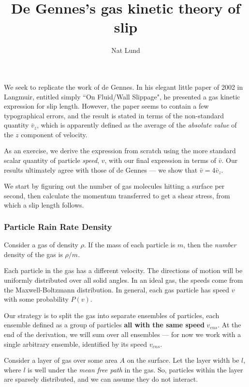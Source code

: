 \documentclass{paper}
\title{De Gennes's gas kinetic theory of slip}
\author{Nat Lund}
\begin{document}
\maketitle
We seek to replicate the work of de Gennes. In his elegant little paper of 2002 in Langmuir, entitled simply ``On Fluid/Wall Slippage", he presented a gas kinetic expression for slip length.  However, the paper seems to contain a few typographical errors, and the result is stated in terms of the non-standard quantity $\bar{v}_{z}$, which is apparently defined as the average of the \emph{absolute value} of the $z$ component of velocity.

As an exercise, we derive the expression from scratch using the more standard scalar quantity of particle \emph{speed}, $v$, with our final expression in terms of $\bar{v}$.  Our results ultimately agree with those of de Gennes --- we show that $\bar{v} = 4 \bar{v}_{z}$.

\vspace{1em}
We start by figuring out the number of gas molecules hitting a surface per second, then calculate the momentum transferred to get a shear stress, from which a slip length follows.

\subsubsection*{Particle Rain Rate Density}

Consider a gas of density $\rho$.  If the mass of each particle is $m$, then the \emph{number} density of the gas is $\rho / m$.

Each particle in the gas has a different velocity. The directions of motion will be uniformly distributed over all solid angles. In an ideal gas, the speeds come from the Maxwell-Boltzmann distribution.  In general, each gas particle has speed $v$ with some probability $P(v)$.

\vspace*{1em}
Our strategy is to split the gas into separate ensembles of particles, each ensemble defined as a group of particles \textbf{all with the same speed} $v_{ens}$.
At the end of the derivation, we will sum over all ensembles --- for now we work with a single arbitrary ensemble, identified by its speed $v_{ens}$.

\vspace{1em}
Consider a layer of gas over some area $A$ on the surface. Let the layer width be $l$, where $l$ is well under the \emph{mean free path} in the gas. So, particles within the layer are sparsely distributed, and we can assume they do not interact.
\end{document}
